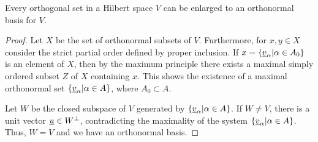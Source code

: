 \begin{theorem}
Every orthogonal set in a Hilbert space $V$ can be enlarged to an orthonormal basis for $V$.
\end{theorem}
\begin{proof}
Let $X$ be the set of orthonormal subsets of $V$.
Furthermore, for $x, y \in X$ consider the strict partial order defined by proper inclusion.
If $x = \left\{ \underline{v}_{\alpha} | \alpha \in A_0 \right\}$ is an element of $X$, then by the maximum principle there exists a maximal simply ordered subset $Z$ of $X$ containing $x$.
This shows the existence of a maximal orthonormal set $\left\{ \underline{v}_{\alpha} | \alpha \in A \right\}$, where $A_0 \subset A$.

Let $W$ be the closed subspace of $V$ generated by $\left\{ \underline{v}_{\alpha} | \alpha \in A \right\}$.
If $W \neq V$, there is a unit vector $\underline{u} \in W^{\bot}$, contradicting the maximality of the system $\left\{ \underline{v}_{\alpha} | \alpha \in A \right\}$.
Thus, $W = V$ and we have an orthonormal basis.
\end{proof}
